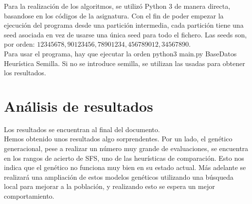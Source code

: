 Para la realización de los algoritmos, se utilizó Python 3 de manera directa, basandose en los códigos de la asignatura. Con el fin de poder empezar la ejecución del programa desde una partición intermedia, cada partición tiene una seed asociada en vez de usarse una única seed para todo el fichero. Las seeds son, por orden: $12345678,90123456,78901234,456789012,34567890$. \\

Para usar el programa, hay que ejecutar la orden  python3 main.py BaseDatos Heurística Semilla. Si no se introduce semilla, se utilizan las usadas para obtener los resultados.
\newpage
\section{Análisis de resultados}
\begin{table}[]
\centering
\caption{Resumen}
\label{my-label}
\end{table}
Los resultados se encuentran al final del documento.\\

Hemos obtenido unos resultados algo sorprendentes. Por un lado, el genético generacional, pese a realizar un número muy grande de evaluaciones, se encuentra en los rangos de acierto de SFS, uno de las heurísticas de comparación. Esto nos indica que el genético no funciona muy bien en su estado actual. Más adelante se realizará una ampliación de estos modelos genéticos utilizando una búsqueda local para mejorar a la población, y realizando esto se espera un mejor comportamiento.\\

